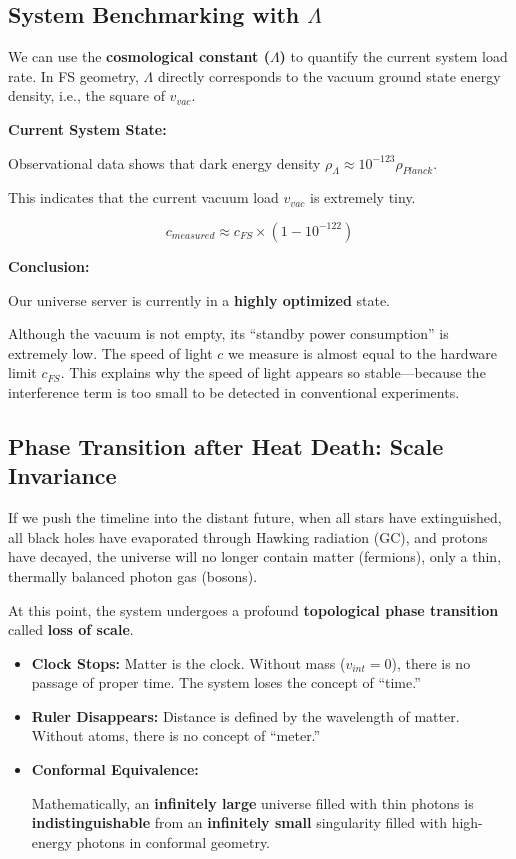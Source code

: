 \documentclass[11pt,a4paper,twoside]{book}
\begin{document}
\subsection{System Benchmarking with $\Lambda$}

We can use the \textbf{cosmological constant ($\Lambda$)} to quantify the current system load rate. In FS geometry, $\Lambda$ directly corresponds to the vacuum ground state energy density, i.e., the square of \textbf{$v_{vac}$}.

\textbf{Current System State:}

Observational data shows that dark energy density $\rho_{\Lambda} \approx 10^{-123} \rho_{Planck}$.

This indicates that the current vacuum load \textbf{$v_{vac}$} is extremely tiny.

$$c_{measured} \approx c_{FS} \times (1 - 10^{-122})$$

\textbf{Conclusion:}

Our universe server is currently in a \textbf{highly optimized} state.

Although the vacuum is not empty, its ``standby power consumption'' is extremely low. The speed of light \textbf{$c$} we measure is almost equal to the hardware limit \textbf{$c_{FS}$}. This explains why the speed of light appears so stable---because the interference term is too small to be detected in conventional experiments.

\subsection{Phase Transition after Heat Death: Scale Invariance}

If we push the timeline into the distant future, when all stars have extinguished, all black holes have evaporated through Hawking radiation (GC), and protons have decayed, the universe will no longer contain matter (fermions), only a thin, thermally balanced photon gas (bosons).

At this point, the system undergoes a profound \textbf{topological phase transition} called \textbf{loss of scale}.

\begin{itemize}
\item \textbf{Clock Stops:} Matter is the clock. Without mass (\textbf{$v_{int} = 0$}), there is no passage of proper time. The system loses the concept of ``time.''

\item \textbf{Ruler Disappears:} Distance is defined by the wavelength of matter. Without atoms, there is no concept of ``meter.''

\item \textbf{Conformal Equivalence:}

    Mathematically, an \textbf{infinitely large} universe filled with thin photons is \textbf{indistinguishable} from an \textbf{infinitely small} singularity filled with high-energy photons in conformal geometry.
\end{itemize}
\end{document}
